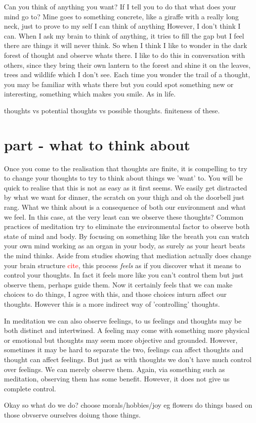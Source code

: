 \documentclass[11pt]{ekblite}
\newcommand\aaron[1]{\textcolor{red}{#1}}
\begin{document}
Can you think of anything you want?
If I tell you to do that what does your mind go to?
Mine goes to something concrete, like a giraffe with a really long neck, just to prove to my self I can think of anything
However, I don't think I can.
When I ask my brain to think of anything, it tries to fill the gap but I feel there are things it will never think.
So when I think I like to wonder in the dark forest of thought and observe whats there.
I like to do this in conversation with others, since they bring their own lantern to the forest and shine it on the leaves, trees and wildlife which I don't see.
Each time you wonder the trail of a thought, you may be familiar with whats there but you could spot something new or interesting, something which makes you smile.
As in life.

thoughts vs potential thoughts vs possible thoughts. finiteness of these.

\section{part - what to think about}

Once you come to the realisation that thoughts are finite, it is compelling to try to change your thoughts to try to think about things we 'want' to.
You will be quick to realise that this is not as easy as it first seems.
We easily get distracted by what we want for dinner, the scratch on your thigh and oh the doorbell just rang.
What we think about is a consequence of both our environment and what we feel.
In this case, at the very least can we observe these thoughts?
Common practices of meditation try to eliminate the environmental factor to observe both state of mind and body.
By focusing on something like the breath you can watch your own mind working as an organ in your body, as surely as your heart beats the mind thinks.
Aside from studies showing that mediation actually does change your brain structure \aaron{cite}, this process \emph{feels} as if you discover what it means to control your thoughts.
In fact it feels more like you can't control them but just observe them, perhaps guide them.
Now it certainly feels that we can make choices to do things, I agree with this, and those choices inturn affect our thoughts.
However this is a more indirect way of 'controlling' thoughts.

In meditation we can also observe feelings, to us feelings and thoughts may be both distinct and intertwined. 
A feeling may come with something more physical or emotional but thoughts may seem more objective and grounded.
However, sometimes it may be hard to separate the two, feelings can affect thoughts and thought can affect feelings.
But just as with thoughts we don't have much control over feelings.
We can merely observe them.
Again, via something such as meditation, observing them has some benefit.
However, it does not give us complete control.

Okay so what do we do?
choose morals/hobbies/joy eg flowers
do things based on those
obvserve ourselves doiung those things.
\end{document}
